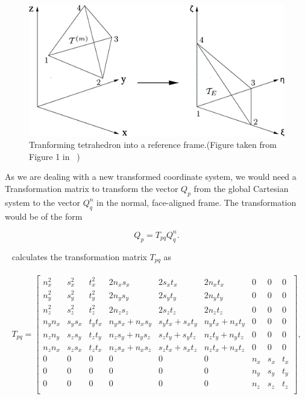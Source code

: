 \begin{figure}
    \centering
    \includegraphics[width=0.6\linewidth]{figures/m_167-1-319-fig001.png}
    \caption{Tranforming tetrahedron into a reference frame.(Figure taken from Figure 1 in ~\parencite{dumbser1})}
    \label{fig:transformation}
\end{figure}

As we are dealing with a new transformed coordinate system, we would need a Transformation matrix to transform the vector $Q_p$
from the global Cartesian system to the vector $Q_q^n$ in the normal, face-aligned frame. The transformation would be of the form

\begin{equation}
    Q_p = T_{pq}Q_q^n .
\end{equation}

~\parencite{dumbser1} calculates the transformation matrix $T_{pq}$ as

\begin{align}
    \begin{split}
    T_{pq} = 
        \begin{bmatrix}
        n_x^2 & s_x^2 & t_x^2 & 2n_x s_x & 2s_x t_x & 2n_x t_x & 0 & 0 & 0 \\
        n_y^2 & s_y^2 & t_y^2 & 2n_y s_y & 2s_y t_y & 2n_y t_y & 0 & 0 & 0 \\
        n_z^2 & s_z^2 & t_z^2 & 2n_z s_z & 2s_z t_z & 2n_z t_z & 0 & 0 & 0 \\
        n_y n_x & s_y s_x & t_y t_x & n_y s_x + n_x s_y & s_y t_x + s_x t_y & n_y t_x + n_x t_y & 0 & 0 & 0 \\
        n_z n_y & s_z s_y & t_z t_y & n_z s_y + n_y s_z & s_z t_y + s_y t_z & n_z t_y + n_y t_z & 0 & 0 & 0 \\
        n_z n_x & s_z s_x & t_z t_x & n_z s_x + n_x s_z & s_z t_x + s_x t_z & n_z t_x + n_x t_z & 0 & 0 & 0 \\
        0 & 0 & 0 & 0 & 0 & 0 & n_x & s_x & t_x \\
        0 & 0 & 0 & 0 & 0 & 0 & n_y & s_y & t_y \\
        0 & 0 & 0 & 0 & 0 & 0 & n_z & s_z & t_z \\
    \end{bmatrix},
    \end{split}
\end{align}


